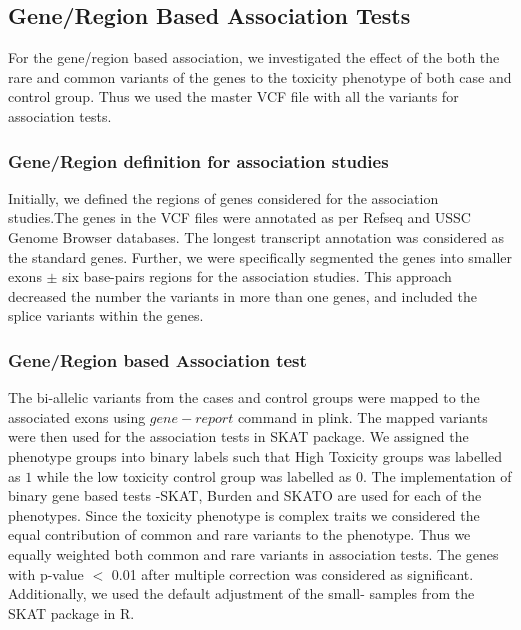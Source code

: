 \subsection{Gene/Region Based Association Tests}

For the gene/region based association, we investigated the effect of the both the rare and common variants of the genes to the toxicity phenotype of both case and control group. Thus we used the master VCF file with all the variants for association tests.

\subsubsection{Gene/Region definition for association studies}

Initially, we defined the regions of genes considered for the association studies.The genes in the VCF files were annotated as per Refseq \cite{pruitt2014refseq} and USSC Genome Browser \cite{karolchik2003ucsc} databases. The longest transcript annotation was considered as the standard genes. Further, we were specifically segmented the genes into smaller exons $\pm$ six base-pairs regions for the association studies. This approach decreased the number the variants in more than one genes, and included the splice variants within the genes.

\subsubsection{Gene/Region based Association test}

The bi-allelic variants from the cases and control groups were mapped to the associated exons using $gene-report$ command in plink. The mapped variants were then used for the association tests in SKAT \cite{SKAT} package. We assigned the phenotype groups into binary labels such that High Toxicity groups was labelled as $1$ while the low toxicity control group was labelled as $0$. The implementation of binary gene based tests -SKAT, Burden and SKATO are used for each of the phenotypes. Since the toxicity phenotype is complex traits we considered the equal contribution of common and rare variants to the phenotype. Thus we equally weighted both common and rare variants in association tests. The genes with p-value $<$ 0.01 after multiple correction was considered as significant. Additionally, we used the default adjustment of the small- samples from the SKAT package in R.


  
